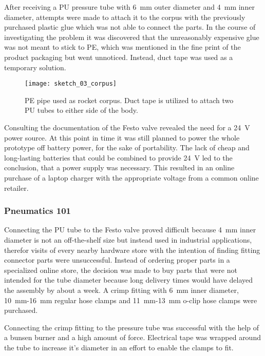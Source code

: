 After receiving a PU pressure tube with \SI{6}{\milli\meter} outer diameter and \SI{4}{\milli\meter} inner diameter, attempts were made to attach it to the corpus with the previously purchased plastic glue which was not able to connect the parts. In the course of investigating the problem it was discovered that the unreasonably expensive glue was not meant to stick to PE, which was mentioned in the fine print of the product packaging but went unnoticed. Instead, duct tape was used as a temporary solution. 

\begin{figure}[h]
\centering

\texttt{[image: sketch\_03\_corpus]}

\caption{PE pipe used as rocket corpus. Duct tape is utilized to attach two PU tubes to either side of the body.}
\end{figure}

Consulting the documentation of the Festo valve revealed the need for a \SI{24}{\volt} power source. At this point in time it was still planned to power the whole prototype off battery power, for the sake of portability. The lack of cheap and long-lasting batteries that could be combined to provide \SI{24}{\volt} led to the conclusion, that a power supply was necessary. This resulted in an online purchase of a laptop charger \cite{power-supply} with the appropriate voltage from a common online retailer.

\subsubsection{Pneumatics 101}
Connecting the PU tube to the Festo valve proved difficult because \SI{4}{\milli\meter} inner diameter is not an off-the-shelf size but instead used in industrial applications, therefor visits of every nearby hardware store with the intention of finding fitting connector parts were unsuccessful. Instead of ordering proper parts in a specialized online store, the decision was made to buy parts that were not intended for the tube diameter because long delivery times would have delayed the assembly by about a week. A crimp fitting with \SI{6}{\milli\meter} inner diameter, \SI{10}{\milli\meter}-\SI{16}{\milli\meter} regular hose clamps and \SI{11}{\milli\meter}-\SI{13}{\milli\meter} o-clip hose clamps were purchased. 

Connecting the crimp fitting to the pressure tube was successful with the help of a bunsen burner and a high amount of force. Electrical tape was wrapped around the tube to increase it's diameter in an effort to enable the clamps to fit.

